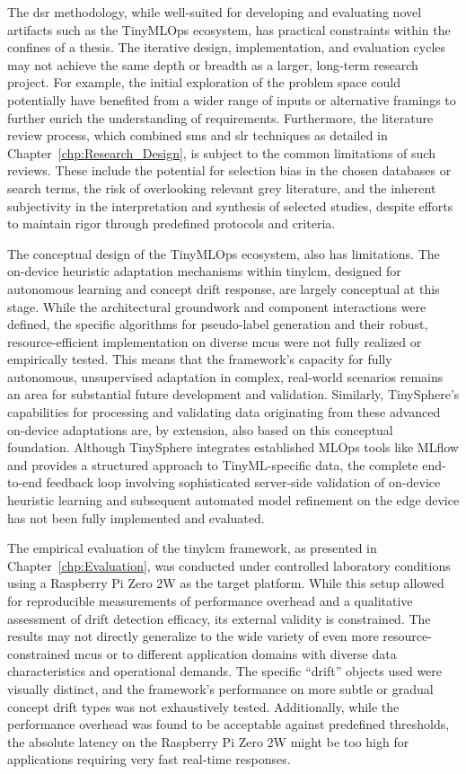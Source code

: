 The \gls{dsr} methodology, while well-suited for developing and evaluating novel artifacts such as the TinyMLOps ecosystem, has practical constraints within the confines of a thesis. The iterative design, implementation, and evaluation cycles may not achieve the same depth or breadth as a larger, long-term research project. For example, the initial exploration of the problem space could potentially have benefited from a wider range of inputs or alternative framings to further enrich the understanding of requirements. Furthermore, the literature review process, which combined \gls{sms} and \gls{slr} techniques as detailed in Chapter~\ref{chp:Research_Design}, is subject to the common limitations of such reviews. These include the potential for selection bias in the chosen databases or search terms, the risk of overlooking relevant grey literature, and the inherent subjectivity in the interpretation and synthesis of selected studies, despite efforts to maintain rigor through predefined protocols and criteria.

The conceptual design of the TinyMLOps ecosystem, also has limitations. The on-device heuristic adaptation mechanisms within \gls{tinylcm}, designed for autonomous learning and concept drift response, are largely conceptual at this stage. While the architectural groundwork and component interactions were defined, the specific algorithms for pseudo-label generation and their robust, resource-efficient implementation on diverse \glspl{mcu} were not fully realized or empirically tested. This means that the framework's capacity for fully autonomous, unsupervised adaptation in complex, real-world scenarios remains an area for substantial future development and validation. Similarly, TinySphere's capabilities for processing and validating data originating from these advanced on-device adaptations are, by extension, also based on this conceptual foundation. Although TinySphere integrates established MLOps tools like MLflow and provides a structured approach to TinyML-specific data, the complete end-to-end feedback loop involving sophisticated server-side validation of on-device heuristic learning and subsequent automated model refinement on the edge device has not been fully implemented and evaluated.

The empirical evaluation of the \gls{tinylcm} framework, as presented in Chapter~\ref{chp:Evaluation}, was conducted under controlled laboratory conditions using a Raspberry Pi Zero 2W as the target platform. While this setup allowed for reproducible measurements of performance overhead and a qualitative assessment of drift detection efficacy, its external validity is constrained. The results may not directly generalize to the wide variety of even more resource-constrained \glspl{mcu} or to different application domains with diverse data characteristics and operational demands. The specific ``drift'' objects used were visually distinct, and the framework's performance on more subtle or gradual concept drift types was not exhaustively tested. Additionally, while the performance overhead was found to be acceptable against predefined thresholds, the absolute latency on the Raspberry Pi Zero 2W might be too high for applications requiring very fast real-time responses.
